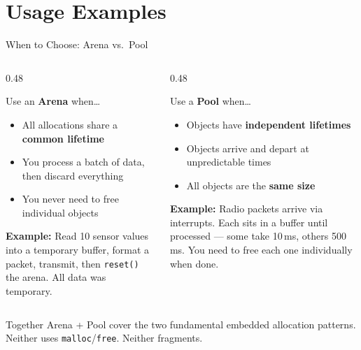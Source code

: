 \documentclass[aspectratio=169, 10pt]{beamer}
\begin{document}
\section{Usage Examples}

\begin{frame}{When to Choose: Arena vs.\ Pool}
\begin{columns}[T]
\begin{column}{0.48\textwidth}
\begin{block}{Use an \textbf{Arena} when\ldots}
\begin{itemize}
  \item All allocations share a \textbf{common lifetime}
  \item You process a batch of data, then discard everything
  \item You never need to free individual objects
\end{itemize}
\vspace{0.3em}
\textbf{Example:} Read 10 sensor values into a temporary
buffer, format a packet, transmit, then \texttt{reset()} the
arena. All data was temporary.
\end{block}
\end{column}

\begin{column}{0.48\textwidth}
\begin{block}{Use a \textbf{Pool} when\ldots}
\begin{itemize}
  \item Objects have \textbf{independent lifetimes}
  \item Objects arrive and depart at unpredictable times
  \item All objects are the \textbf{same size}
\end{itemize}
\vspace{0.3em}
\textbf{Example:} Radio packets arrive via interrupts.
Each sits in a buffer until processed --- some take 10\,ms,
others 500\,ms. You need to free each one individually
when done.
\end{block}
\end{column}
\end{columns}

\vspace{0.5em}
\begin{alertblock}{Together}
Arena + Pool cover the two fundamental embedded allocation
patterns. Neither uses \texttt{malloc}/\texttt{free}. Neither fragments.
\end{alertblock}
\end{frame}
\end{document}
